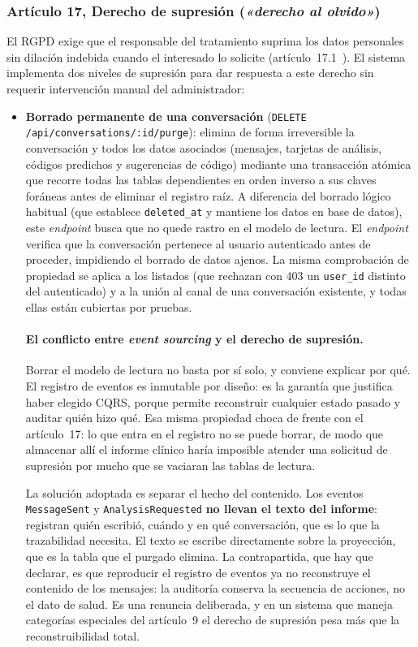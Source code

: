 \subsubsection{Artículo 17, Derecho de supresión (\emph{«derecho al olvido»})}

El RGPD exige que el responsable del tratamiento suprima los datos personales sin dilación indebida cuando el interesado lo solicite (artículo~17.1~\cite{RGPD16}). El sistema implementa dos niveles de supresión para dar respuesta a este derecho sin requerir intervención manual del administrador:

\begin{itemize}
 \item \textbf{Borrado permanente de una conversación} (\texttt{DELETE /api/conversations/\allowbreak{}:id/purge}): elimina de forma irreversible la conversación y todos los datos asociados (mensajes, tarjetas de análisis, códigos predichos y sugerencias de código) mediante una transacción atómica que recorre todas las tablas dependientes en orden inverso a sus claves foráneas antes de eliminar el registro raíz. A diferencia del borrado lógico habitual (que establece \texttt{deleted\_at} y mantiene los datos en base de datos), este \emph{endpoint} busca que no quede rastro en el modelo de lectura. El \emph{endpoint} verifica que la conversación pertenece al usuario autenticado antes de proceder, impidiendo el borrado de datos ajenos. La misma comprobación de propiedad se aplica a los listados (que rechazan con 403 un \texttt{user\_id} distinto del autenticado) y a la unión al canal de una conversación existente, y todas ellas están cubiertas por pruebas.

\paragraph{El conflicto entre \emph{event sourcing} y el derecho de supresión.}
Borrar el modelo de lectura no basta por sí solo, y conviene explicar por qué. El registro de eventos es inmutable por diseño: es la garantía que justifica haber elegido CQRS, porque permite reconstruir cualquier estado pasado y auditar quién hizo qué. Esa misma propiedad choca de frente con el artículo~17: lo que entra en el registro no se puede borrar, de modo que almacenar allí el informe clínico haría imposible atender una solicitud de supresión por mucho que se vaciaran las tablas de lectura.

La solución adoptada es separar el hecho del contenido. Los eventos \texttt{MessageSent} y \mbox{\texttt{AnalysisRequested}} \textbf{no llevan el texto del informe}: registran quién escribió, cuándo y en qué conversación, que es lo que la trazabilidad necesita. El texto se escribe directamente sobre la proyección, que es la tabla que el purgado elimina. La contrapartida, que hay que declarar, es que reproducir el registro de eventos ya no reconstruye el contenido de los mensajes: la auditoría conserva la secuencia de acciones, no el dato de salud. Es una renuncia deliberada, y en un sistema que maneja categorías especiales del artículo~9 el derecho de supresión pesa más que la reconstruibilidad total.


\end{itemize}
